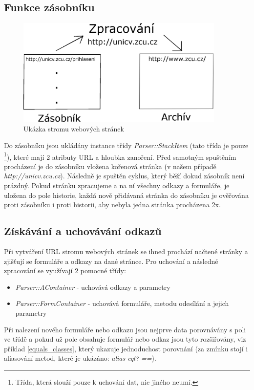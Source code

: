 \documentclass[12pt, a4paper]{report}
\begin{document}
\subsection{Funkce zásobníku}
\begin{figure}[h!]
\includegraphics[width=390px]{stack_example.eps}
\caption{Ukázka stromu webových stránek}
\label{obr.url_tree}
\end{figure}
Do zásobníku jsou ukládány instance třídy \textit{Parser::StackItem} (tato třída je pouze \footnote{Třída, která slouží pouze k uchování dat, nic jiného neumí.}), které mají 2 atributy URL a hloubka zanoření. Před samotným spuštěním procházení je do zásobníku vložena kořenová stránka (v našem případě \textit{http://unicv.zcu.cz}). Následně je spuštěn cyklus, který běží dokud zásobník není prázdný. Pokud stránku zpracujeme a na ní všechny odkazy a formuláře, je uložena do pole historie, každá nově přidávaná stránka do zásobníku je ověřována proti zásobníku i proti historii, aby nebyla jedna stránka procházena 2x.

\subsection{Získávání a uchovávání odkazů}
Při vytváření URL stromu webových stránek se ihned prochází načtené stránky a zjišťují se formuláře a odkazy na dané stránce. Pro uchování a následné zpracování se využívají 2 pomocné třídy:
\begin{itemize}
\item \textit{Parser::AContainer} - uchovává odkazy a parametry
\item \textit{Parser::FormContainer} - uchovává formuláře, metodu odesílání a jejich parametry
\end{itemize}
Při nalezení nového formuláře nebo odkazu jsou nejprve data porovnávány s poli ve třídě a pokud už pole obsahuje formulář nebo odkaz jsou tyto rozšiřovány, viz příklad \ref{equals_classes}, který ukazuje jednoduchost porovnání (za zmínku stojí i aliasování metod, které je ukázáno: \textit{alias eql? ==}).
\end{document}
